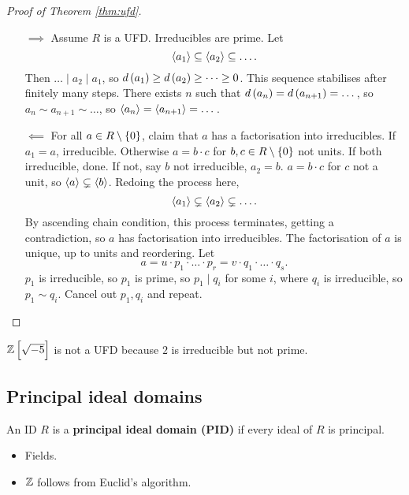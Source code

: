 \begin{proof}[Proof of Theorem \ref{thm:ufd}]
\hfill
\begin{itemize}
\item[$ \implies $] Assume $ R $ is a UFD. Irreducibles are prime. Let
$$ \left\langle a_1 \right\rangle \subseteq \left\langle a_2 \right\rangle \subseteq \dots. $$
Then $ \dots \mid a_2 \mid a_1 $, so $ d\br{a_1} \ge d\br{a_2} \ge \dots \ge 0 $. This sequence stabilises after finitely many steps. There exists $ n $ such that $ d\br{a_n} = d\br{a_{n + 1}} = \dots $, so $ a_n \sim a_{n + 1} \sim \dots $, so $ \left\langle a_n \right\rangle = \left\langle a_{n + 1} \right\rangle = \dots $.
\item[$ \impliedby $] For all $ a \in R \setminus \cbr{0} $, claim that $ a $ has a factorisation into irreducibles. If $ a_1 = a $, irreducible. Otherwise $ a = b \cdot c $ for $ b, c \in R \setminus \cbr{0} $ not units. If both irreducible, done. If not, say $ b $ not irreducible, $ a_2 = b $. $ a = b \cdot c $ for $ c $ not a unit, so $ \left\langle a \right\rangle \subsetneq \left\langle b \right\rangle $. Redoing the process here,
$$ \left\langle a_1 \right\rangle \subsetneq \left\langle a_2 \right\rangle \subsetneq \dots. $$
By ascending chain condition, this process terminates, getting a contradiction, so $ a $ has factorisation into irreducibles. The factorisation of $ a $ is unique, up to units and reordering. Let
$$ a = u \cdot p_1 \cdot \dots \cdot p_r = v \cdot q_1 \cdot \dots \cdot q_s. $$
$ p_1 $ is irreducible, so $ p_1 $ is prime, so $ p_1 \mid q_i $ for some $ i $, where $ q_i $ is irreducible, so $ p_1 \sim q_i $. Cancel out $ p_1, q_i $ and repeat.
\end{itemize}
\end{proof}

\begin{remark*}
$ \Z\sbr{\sqrt{-5}} $ is not a UFD because $ 2 $ is irreducible but not prime.
\end{remark*}

\pagebreak

\subsection{Principal ideal domains}

\begin{definition}
An ID $ R $ is a \textbf{principal ideal domain (PID)} if every ideal of $ R $ is principal.
\end{definition}

\begin{example*}
\hfill
\begin{itemize}
\item Fields.
\item $ \mathbb{Z} $ follows from Euclid's algorithm.
\end{itemize}
\end{example*}

